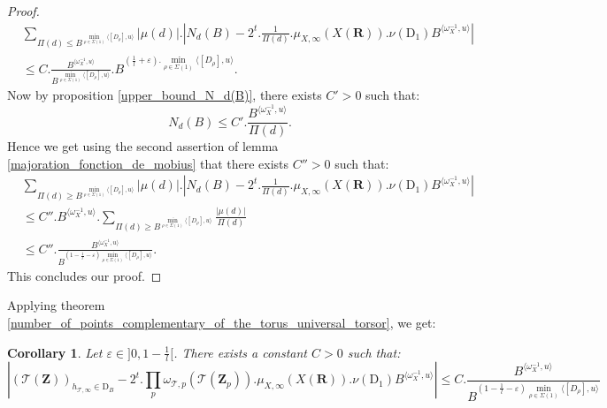 \documentclass{proc-l}
\newcommand{\R}{\mathbf{R}}
\newcommand{\Z}{\mathbf{Z}}
\newcommand{\stackT}{\mathcal{T}}
\newcommand{\w}{\omega}
\newtheorem{cor}[theorem]{Corollary}
\theoremstyle{definition}
\theoremstyle{remark}
\numberwithin{equation}{section}
\begin{document}
\begin{proof}
    \begin{align*}
        &\sum\limits_{\Pi(d) \leqslant B^{\min\limits_{\rho \in \Sigma(1)} \langle [D_{\rho}] , u \rangle }} | \mu(d) | . \left| N_d(B) - 2^t . \frac{1}{\Pi(d)} . \mu_{X,\infty}(X(\R)). \nu(\mathrm{D}_1) B^{ \langle \w_{X}^{-1} , u \rangle } \right| \\
         &\leqslant C.\frac{B^{\langle \w_X^{-1},u\rangle}}{B^{ \min\limits_{\rho \in \Sigma(1)} \langle [D_{\rho}],u\rangle } } . B^{(\frac{1}{l} + \varepsilon).\min\limits_{\rho \in \Sigma(1)} \langle [D_{\rho}],u\rangle }.
    \end{align*}
    Now by proposition \ref{upper_bound_N_d(B)}, there exists $C' > 0$ such that:
    $$N_d(B) \leqslant C'.\frac{B^{\langle \w_{X}^{-1} , u \rangle}}{\Pi(d)} .$$ Hence we get using the second assertion of lemma \ref{majoration_fonction_de_mobius} that there exists $C'' > 0$ such that:
    \begin{align*}
        &\sum\limits_{\Pi(d) \geqslant B^{\min\limits_{\rho \in \Sigma(1)} \langle [D_{\rho}] , u \rangle }} | \mu(d) | . \left| N_d(B) - 2^t . \frac{1}{\Pi(d)} . \mu_{X,\infty}(X(\R)). \nu(\mathrm{D}_1) B^{ \langle \w_{X}^{-1} , u \rangle } \right| \\
        &\leqslant C''. B^{\langle \w_X^{-1},u\rangle} .\sum\limits_{\Pi(d) \geqslant B^{\min\limits_{\rho \in \Sigma(1)} \langle [D_{\rho}] , u \rangle }} \frac{| \mu(d) |}{\Pi(d)} \\
        &\leqslant C''.\frac{B^{\langle \w_X^{-1},u\rangle}}{B^{(1-\frac{1}{l} - \varepsilon) \min\limits_{\rho \in \Sigma(1)} \langle [D_{\rho}],u\rangle } } .
    \end{align*}This concludes our proof.    
\end{proof}

Applying theorem \ref{number_of_points_complementary_of_the_torus_universal_torsor}, we get:

\begin{cor}\label{conclusion_torsor_univ}
Let $\varepsilon \in ]0,1-\frac{1}{l}[$. There exists a constant $C > 0$ such that:
\vspace{0,1 cm}
    $$\left| (\stackT(\Z) )_{h_{\stackT,\infty} \in \mathrm{D}_B}  - 2^t . \prod\limits_p \w_{\stackT,p}(\stackT(\Z_p)) . \mu_{X,\infty}(X(\R)). \nu(\mathrm{D}_1) B^{ \langle \w_{X}^{-1} , u \rangle } \right| \leqslant C . \frac{B^{\langle \w_{X}^{-1} , u \rangle}}{B^{(1 - \frac{1}{l} - \varepsilon) \min\limits_{\rho \in \Sigma(1)} \langle [D_{\rho}] , u \rangle }}$$
\end{cor}
\end{document}
